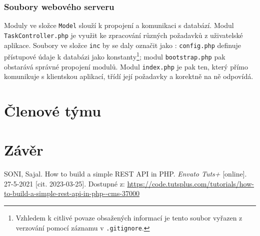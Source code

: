 \documentclass[titlepage]{article}
\begin{document}
\subsubsection{Soubory webového serveru}
\vspace{1em}
Moduly ve složce \texttt{Model} slouží k propojení a komunikaci s databází. Modul \texttt{Task\-Controller.php} je využit ke zpracování různých požadavků z uživatelské aplikace. Soubory ve složce \texttt{inc} by se daly označit jako : \texttt{config.php} definuje přístupové údaje k databázi jako konstanty\footnote{Vzhledem k citlivé povaze obsažených informací je tento soubor vyřazen z verzování pomocí záznamu v \texttt{.gitignore}.}; modul \texttt{boot\-strap.php} pak obstarává správné propojení modulů. Modul \texttt{index.php} je pak ten, který přímo komunikuje s klientskou aplikací, třídí její požadavky a korektně na ně odpovídá. 

\section{Členové týmu}

\section*{Závěr}



\begin{thebibliography}{9}
    SONI, Sajal. How to build a simple REST API in PHP. \emph{En\-va\-to Tuts+} [on\-li\-ne]. 27-5-2021 [cit. 2023-03-25]. Dostupné z: \url{https://code.tutsplus.com/tutorials/how-to-build-a-simple-rest-api-in-php--cms-37000}
\end{thebibliography}
\end{document}
